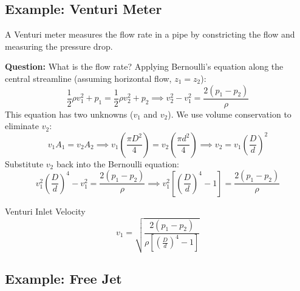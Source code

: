 \subsection{Example: Venturi Meter}

A Venturi meter measures the flow rate in a pipe by constricting the flow and measuring the pressure drop.

\begin{center}
\end{center}

\textbf{Question:} What is the flow rate?
Applying Bernoulli's equation along the central streamline (assuming horizontal flow, $z_1 = z_2$):
\[
\frac{1}{2}\rho v_{1}^{2} + p_{1} = \frac{1}{2}\rho v_{2}^{2} + p_{2} \implies v_{2}^{2} - v_{1}^{2} = \frac{2(p_{1} - p_{2})}{\rho}
\]
This equation has two unknowns ($v_1$ and $v_2$). We use volume conservation to eliminate $v_2$:
\[
v_{1} A_{1} = v_{2} A_{2} \implies v_{1}\left(\frac{\pi D^2}{4}\right) = v_{2}\left(\frac{\pi d^2}{4}\right) \implies v_{2} = v_{1}\left(\frac{D}{d}\right)^{2}
\]
Substitute $v_2$ back into the Bernoulli equation:
\[
v_{1}^{2}\left(\frac{D}{d}\right)^{4} - v_{1}^{2} = \frac{2(p_{1} - p_{2})}{\rho} \implies v_{1}^{2}\left[ \left(\frac{D}{d}\right)^{4} - 1 \right] = \frac{2(p_{1} - p_{2})}{\rho}
\]

\begin{resultboxnamed}{Venturi Inlet Velocity}
\[
v_{1} = \sqrt{\frac{2(p_{1} - p_{2})}{\rho \left[ \left(\frac{D}{d}\right)^{4} - 1 \right]}}
\]
\end{resultboxnamed}

\subsection{Example: Free Jet}

